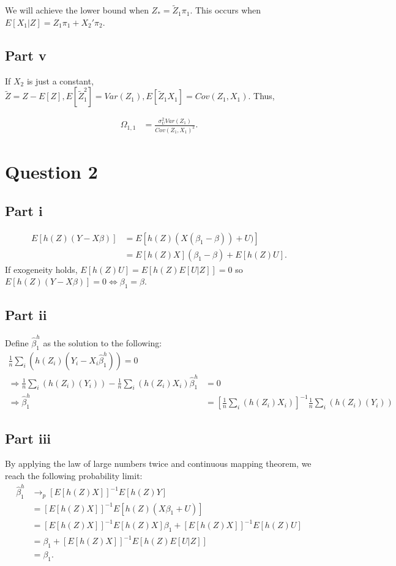 \documentclass[11pt]{article} %
\begin{document}
We will achieve the lower bound when $Z_{*} = \tilde{Z}_1\pi_1$. This occurs when $E[X_1|Z] = Z_1\pi_1 + X_2'\pi_2$.
\subsection{Part v}
If $X_2$ is just a constant, $\tilde{Z} = Z-E[Z],E[\tilde{Z}_{1}^2] = Var(Z_1), E[\tilde{Z}_1X_1] = Cov(Z_1,X_1).$ Thus,

\begin{align*}
\Omega_{1,1} &= \frac{\sigma_U^2Var(Z_1)}{Cov(Z_1,X_1)^2}.
\end{align*}

\section{Question 2}
\subsection{Part i}
\begin{align*}
E[h(Z)(Y-X\beta)] &= E[h(Z)(X(\beta_1 - \beta)) + U)]\\
&= E[h(Z)X](\beta_1 - \beta) + E[h(Z)U].
\end{align*}
If exogeneity holds, $E[h(Z)U] = E[h(Z)E[U|Z]] = 0$ so $E[h(Z)(Y-X\beta)] = 0 \iff \beta_1 = \beta.$
\subsection{Part ii}
Define $\hat{\beta}^{h}_1$ as the solution to the following:
\begin{align}
\frac{1}{n}\sum_{i}(h(Z_i)(Y_i - X_i \hat{\beta}^{h}_1)) = 0\\
\Rightarrow \frac{1}{n}\sum_{i}(h(Z_i)(Y_i)) - \frac{1}{n}\sum_{i}(h(Z_i)X_i) \hat{\beta}^{h}_1 &= 0\\
\Rightarrow \hat{\beta}^{h}_1 &= \left[\frac{1}{n}\sum_{i}(h(Z_i)X_i)\right]^{-1}\frac{1}{n}\sum_{i}(h(Z_i)(Y_i))
\end{align}
\subsection{Part iii}
By applying the law of large numbers twice and continuous mapping theorem, we reach the following probability limit:
\begin{align*}
\hat{\beta}^{h}_1 &\rightarrow_p [E[h(Z)X]]^{-1}E[h(Z)Y]\\
&= [E[h(Z)X]]^{-1}E[h(Z)(X\beta_1 +U)]\\
&= [E[h(Z)X]]^{-1}E[h(Z)X]\beta_1 + [E[h(Z)X]]^{-1}E[h(Z)U]\\
&=\beta_1 + [E[h(Z)X]]^{-1}E[h(Z)E[U|Z]]\\
&= \beta_1.
\end{align*}
\end{document}
